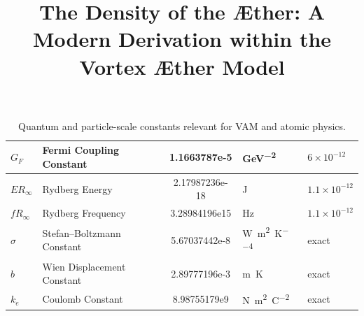 \begin{table}[H]
\begin{tabular}{|l|l|S[scientific-notation = true] |l|l|}
        $G_F$ & Fermi Coupling Constant & 1.1663787e-5 & \si{\giga\electronvolt^{-2}} & $6 \times 10^{-12}$ \\ \hline
        $ER_\infty$ & Rydberg Energy & 2.17987236e-18 & \si{\joule} & $1.1 \times 10^{-12}$ \\ \hline
        $fR_\infty$ & Rydberg Frequency & 3.28984196e15 & \si{\hertz} & $1.1 \times 10^{-12}$ \\ \hline
        $\sigma$ & Stefan–Boltzmann Constant & 5.67037442e-8 & \si{\watt\per\meter\squared\per\kelvin^4} & exact \\ \hline
        $b$ & Wien Displacement Constant & 2.89777196e-3 & \si{\meter\kelvin} & exact \\ \hline
        $k_e$ & Coulomb Constant & 8.98755179e9 & \si{\newton\meter\squared\per\coulomb\squared} & exact \\ \hline
    \end{tabular}
    \caption{Quantum and particle-scale constants relevant for VAM and atomic physics.}
    \label{tab:quantum_constants}
\end{table}



\documentclass[12pt]{article}
\usepackage{amsmath,amsfonts}
\usepackage{graphicx}
\usepackage{cite}
\usepackage{hyperref}
\hypersetup{colorlinks=true, linkcolor=blue, citecolor=blue, urlcolor=blue}

\title{The Density of the Æther: A Modern Derivation within the Vortex Æther Model}
\author{}
\date{}



\maketitle

\begin{abstract}
This article refines previous estimates of the Æther's density, $\rho_{\text{\ae}}$, in the Vortex Æther Model (VAM). Integrating findings from quantum vortex dynamics, superfluid helium, gravitomagnetic frame-dragging, and cosmological vacuum energy, we propose constrained ranges for $\rho_{\scriptscriptstyle\boldsymbol\!f}$ and $\rho_{\scriptscriptstyle\boldsymbol\!E}$ and examine their implications across scales.
\end{abstract}

\section{Introduction}

